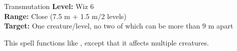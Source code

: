 {Transmutation}
{
	\textbf{Level:}
	Wiz 6\\
	\textbf{Range:}
	Close (7.5 m + 1.5 m/2 levels)\\
	\textbf{Target:}
	One creature/level, no two of which can be more than 9 m apart\\
}
{
	This spell functions like , except that it affects multiple creatures.

}
